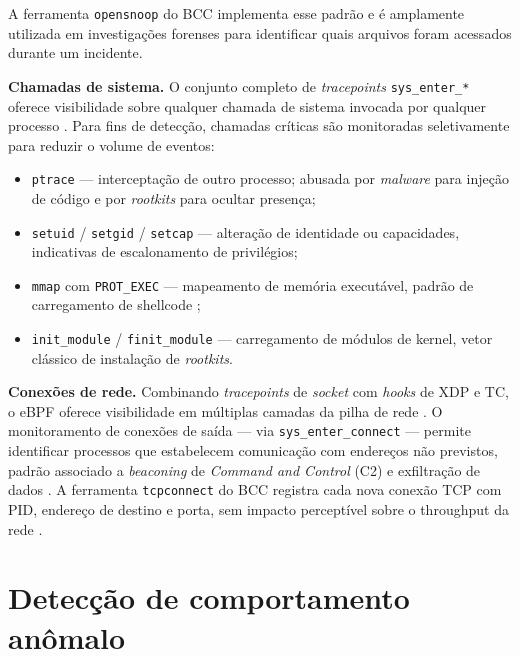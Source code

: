 A ferramenta \texttt{opensnoop} do BCC \cite{bcc} implementa esse padrão e é
amplamente utilizada em investigações forenses para identificar quais arquivos
foram acessados durante um incidente.

\textbf{Chamadas de sistema.}
O conjunto completo de \textit{tracepoints} \texttt{sys\_enter\_*} oferece
visibilidade sobre qualquer chamada de sistema invocada por qualquer processo
\cite{linuxkernel2024}.
Para fins de detecção, chamadas críticas são monitoradas seletivamente para
reduzir o volume de eventos:

\begin{itemize}
  \item \texttt{ptrace} — interceptação de outro processo; abusada por
        \textit{malware} para injeção de código e por \textit{rootkits} para
        ocultar presença;
  \item \texttt{setuid} / \texttt{setgid} / \texttt{setcap} — alteração de
        identidade ou capacidades, indicativas de escalonamento de privilégios;
  \item \texttt{mmap} com \texttt{PROT\_EXEC} — mapeamento de memória executável,
        padrão de carregamento de shellcode \cite{gregg2019};
  \item \texttt{init\_module} / \texttt{finit\_module} — carregamento de módulos
        de kernel, vetor clássico de instalação de \textit{rootkits}.
\end{itemize}

\textbf{Conexões de rede.}
Combinando \textit{tracepoints} de \textit{socket} com \textit{hooks} de XDP e
TC, o eBPF oferece visibilidade em múltiplas camadas da pilha de rede
\cite{linuxkernel2024}.
O monitoramento de conexões de saída — via \texttt{sys\_enter\_connect} — permite
identificar processos que estabelecem comunicação com endereços não previstos,
padrão associado a \textit{beaconing} de \textit{Command and Control} (C2) e
exfiltração de dados \cite{cassagnes2020}.
A ferramenta \texttt{tcpconnect} do BCC \cite{bcc} registra cada nova conexão TCP
com PID, endereço de destino e porta, sem impacto perceptível sobre o throughput
da rede \cite{gregg2019}.

\section{Detecção de comportamento anômalo}

